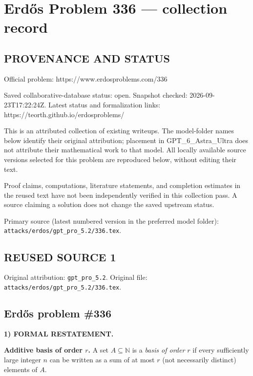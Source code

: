 \section*{Erd\H{o}s Problem 336 --- collection record}

\subsection*{PROVENANCE AND STATUS}
Official problem: https://www.erdosproblems.com/336

Saved collaborative-database status: open.
Snapshot checked: 2026-09-23T17:22:24Z.
Latest status and formalization links: https://teorth.github.io/erdosproblems/

This is an attributed collection of existing writeups. The model-folder names below identify their original attribution; placement in GPT\_6\_Astra\_Ultra does not attribute their mathematical work to that model. All locally available source versions selected for this problem are reproduced below, without editing their text.

Proof claims, computations, literature statements, and completion estimates in the reused text have not been independently verified in this collection pass. A source claiming a solution does not change the saved upstream status.

Primary source (latest numbered version in the preferred model folder): \texttt{attacks/erdos/gpt\_pro\_5.2/336.tex}.

\subsection*{REUSED SOURCE 1}
Original attribution: \texttt{gpt\_pro\_5.2}.
Original file: \texttt{attacks/erdos/gpt\_pro\_5.2/336.tex}.

\subsection*{Erd\H{o}s problem \#336}

\noindent\textbf{1) FORMAL RESTATEMENT.}

\medskip
\noindent\textbf{Additive basis of order $r$.}
A set $A\subseteq\mathbb{N}$ is a \emph{basis of order $r$} if every sufficiently large integer $n$ can be written as a sum of at most $r$ (not necessarily distinct) elements of $A$.

